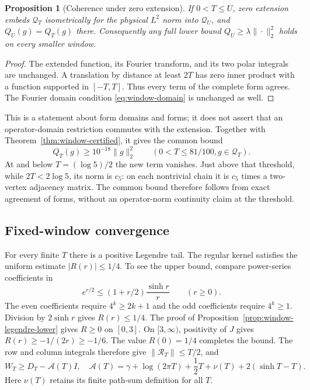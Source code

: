 \documentclass[11pt]{article}
\newtheorem{proposition}[theorem]{Proposition}
\theoremstyle{definition}
\theoremstyle{remark}
\numberwithin{equation}{section}
\begin{document}
\begin{proposition}[Coherence under zero extension]
\label{prop:window-extension}
If $0<T\le U$, zero extension embeds $\mathcal Q_T$ isometrically
for the physical $L^2$ norm into $\mathcal Q_U$, and
$Q_U(g)=Q_T(g)$ there.  Consequently any full lower bound
$Q_U\ge\lambda\|\cdot\|_2^2$ holds on every smaller window.
\end{proposition}
\begin{proof}
The extended function, its Fourier transform, and its two polar
integrals are unchanged.  A translation by distance at least $2T$
has zero inner product with a function supported in $[-T,T]$.
Thus every term of the complete form agrees.  The Fourier domain
condition \eqref{eq:window-domain} is unchanged as well.
\end{proof}

This is a statement about form domains and forms; it does not assert
that an operator-domain restriction commutes with the extension.
Together with Theorem~\ref{thm:window-certified}, it gives the
common bound
\begin{equation}
 Q_T(g)\ge10^{-18}\|g\|_2^2
 \qquad(0<T\le81/100, g\in\mathcal Q_T).
 \label{eq:window-common-bound}
\end{equation}
At and below $T=(\log5)/2$ the new term vanishes.  Just above
that threshold, while $2T<2\log5$, its norm is $c_5$: on each
nontrivial chain it is $c_5$ times a two-vertex adjacency matrix.
The common bound therefore follows from exact agreement of forms,
without an operator-norm continuity claim at the threshold.

\subsection{Fixed-window convergence}

For every finite $T$ there is a positive Legendre tail.  The
regular kernel satisfies the uniform estimate $|R(r)|\le1/4$.
To see the upper bound, compare power-series coefficients in
\[
 e^{r/2}\le(1+r/2)\frac{\sinh r}{r}\qquad(r\ge0).
\]
The even coefficients require $4^k\ge2k+1$ and the odd
coefficients require $4^k\ge1$.  Division by $2\sinh r$ gives
$R(r)\le1/4$.  The proof of
Proposition~\ref{prop:window-legendre-lower} gives $R\ge0$ on
$[0,3]$.  On $[3,\infty)$, positivity of $J$ gives
$R(r)\ge-1/(2r)\ge-1/6$.  The value $R(0)=1/4$ completes the bound.
The row and column integrals therefore give
$\|\mathcal R_T\|\le T/2$, and
\begin{equation}
 W_T\ge D_T-\mathcal A(T)I,
 \quad
 \mathcal A(T)=\gamma+\log(2\pi T)+\frac12T
                   +\nu(T)+2(\sinh T-T).
 \label{eq:window-global-comparison}
\end{equation}
Here $\nu(T)$ retains its finite path-sum definition for all $T$.
\end{document}
